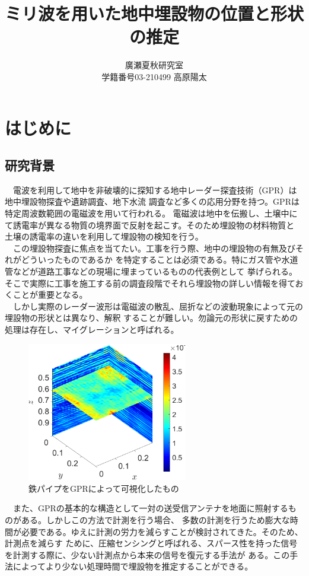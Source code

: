 \documentclass[a4paper,12pt]{jsreport}
\title{ミリ波を用いた地中埋設物の位置と形状の推定}
\author{廣瀬夏秋研究室\\
学籍番号03-210499 高原陽太}
\begin{document}
\maketitle
\tableofcontents
\clearpage
\chapter{はじめに}
\section{研究背景}
　電波を利用して地中を非破壊的に探知する地中レーダー探査技術（GPR）は地中埋設物探査や遺跡調査、地下水流
調査など多くの応用分野を持つ\cite{radar1}\cite{radar2}。GPRは特定周波数範囲の電磁波を用いて行われる。
電磁波は地中を伝搬し、土壌中にて誘電率が異なる物質の境界面で反射を起こす。そのため埋設物の材料物質と
土壌の誘電率の違いを利用して埋設物の検知を行う。
\\　この埋設物探査に焦点を当てたい。工事を行う際、地中の埋設物の有無及びそれがどういったものであるか
を特定することは必須である。特にガス管や水道管などが道路工事などの現場に埋まっているものの代表例として
挙げられる。そこで実際に工事を施工する前の調査段階でそれら埋設物の詳しい情報を得ておくことが重要となる。
\\　しかし実際のレーダー波形は電磁波の散乱、屈折などの波動現象によって元の埋設物の形状とは異なり、解釈
することが難しい。勿論元の形状に戻すための処理は存在し、マイグレーションと呼ばれる。


\begin{figure}[h]
  \begin{center}
   \includegraphics[width=7cm]{./image/0918.png}
   
  \caption{鉄パイプをGPRによって可視化したもの}\label{鉄パイプをGPRによって可視化したもの}
  \end{center}
  \end{figure}

　また、GPRの基本的な構造として一対の送受信アンテナを地面に照射するものがある。しかしこの方法で計測を行う場合、
多数の計測を行うため膨大な時間が必要である。ゆえに計測の労力を減らすことが検討されてきた。そのため、計測点を減らす
ために、圧縮センシングと呼ばれる、スパース性を持った信号を計測する際に、少ない計測点から本来の信号を復元する手法が
ある。この手法によってより少ない処理時間で埋設物を推定することができる。
\end{document}
